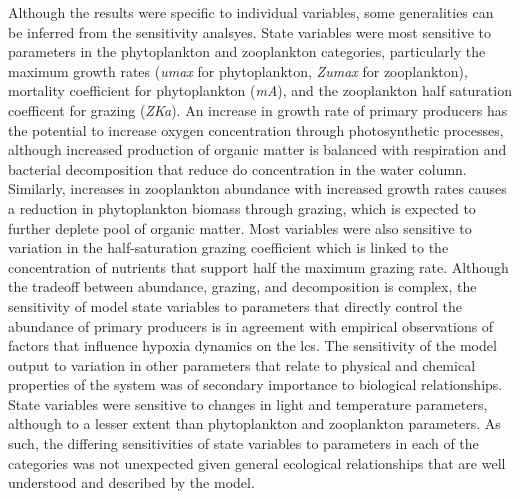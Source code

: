 \documentclass[letterpaper,12pt,oneside]{article}\usepackage[]{graphicx}\usepackage[]{color}
\begin{document}
Although the results were specific to individual variables, some generalities can be inferred from the sensitivity analsyes. State variables were most sensitive to parameters in the phytoplankton and zooplankton categories, particularly the maximum growth rates (\textit{umax} for phytoplankton, \textit{Zumax} for zooplankton), mortality coefficient for phytoplankton (\textit{mA}), and the zooplankton half saturation coefficent for grazing (\textit{ZKa}). An increase in growth rate of primary producers has the potential to increase oxygen concentration through photosynthetic processes, although increased production of organic matter is balanced with respiration and bacterial decomposition that reduce \ac{do} concentration in the water column.  Similarly, increases in zooplankton abundance with increased growth rates causes a reduction in phytoplankton biomass through grazing, which is expected to further deplete pool of organic matter.  Most variables were also sensitive to variation in the half-saturation grazing coefficient which is linked to the concentration of nutrients that support half the maximum grazing rate. Although the tradeoff between abundance, grazing, and decomposition is complex, the sensitivity of model state variables to parameters that directly control the abundance of primary producers is in agreement with empirical observations of factors that influence hypoxia dynamics on the \ac{lcs}. The sensitivity of the model output to variation in other parameters that relate to physical and chemical properties of the system was of secondary importance to biological relationships.  State variables were sensitive to changes in light and temperature parameters, although to a lesser extent than phytoplankton and zooplankton parameters.  As such, the differing sensitivities of state variables to parameters in each of the categories was not unexpected given general ecological relationships that are well understood and described by the model.    
\end{document}
